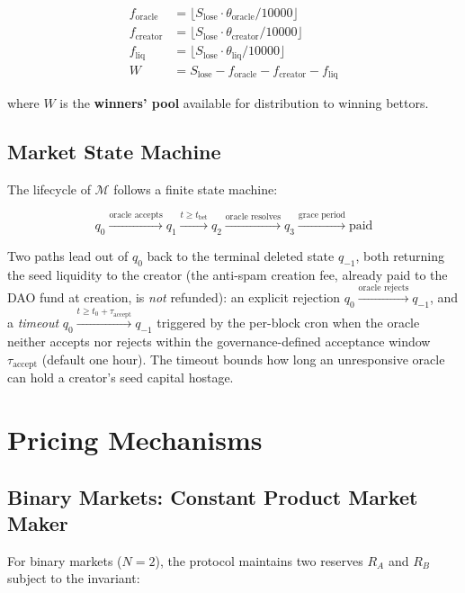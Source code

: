 \documentclass{ledger}
\theoremstyle{plain}
\theoremstyle{remark}
\begin{document}
\begin{align*}
f_{\text{oracle}}  &= \lfloor S_{\text{lose}} \cdot \theta_{\text{oracle}} / 10000 \rfloor \\
f_{\text{creator}} &= \lfloor S_{\text{lose}} \cdot \theta_{\text{creator}} / 10000 \rfloor \\
f_{\text{liq}}     &= \lfloor S_{\text{lose}} \cdot \theta_{\text{liq}} / 10000 \rfloor \\
W &= S_{\text{lose}} - f_{\text{oracle}} - f_{\text{creator}} - f_{\text{liq}}
\end{align*}

where $W$ is the \textbf{winners' pool} available for distribution to winning
bettors.

\subsection{Market State Machine}\label{sec:fsm}

The lifecycle of $\mathcal{M}$ follows a finite state machine:

\[
q_0 \xrightarrow{\text{oracle accepts}} q_1 \xrightarrow{t \geq t_{\text{bet}}}
q_2 \xrightarrow{\text{oracle resolves}} q_3 \xrightarrow{\text{grace period}}
\text{paid}
\]

Two paths lead out of $q_0$ back to the terminal deleted state $q_{-1}$, both
returning the seed liquidity to the creator (the anti-spam creation fee, already
paid to the DAO fund at creation, is \emph{not} refunded): an explicit rejection
$q_0 \xrightarrow{\text{oracle rejects}} q_{-1}$, and a \emph{timeout}
$q_0 \xrightarrow{t \geq t_0 + \tau_{\text{accept}}} q_{-1}$ triggered by the
per-block cron when the oracle neither accepts nor rejects within the
governance-defined acceptance window $\tau_{\text{accept}}$ (default one hour).
The timeout bounds how long an unresponsive oracle can hold a creator's seed
capital hostage.

\section{Pricing Mechanisms}\label{sec:pricing}

\subsection{Binary Markets: Constant Product Market Maker}

For binary markets ($N = 2$), the protocol maintains two reserves $R_A$ and
$R_B$ subject to the invariant:
\end{document}
